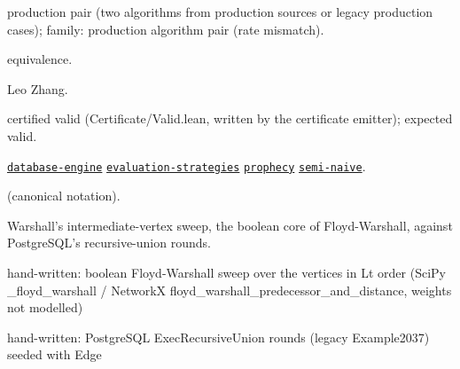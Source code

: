 \documentclass[10pt]{article}
\begin{document}
\begin{description}[leftmargin=2.6cm,style=nextline,itemsep=1pt]

\item[Category] production pair (two algorithms from production sources or legacy production cases); family: production algorithm pair (rate mismatch).

\item[Kind] equivalence.

\item[Contributors] Leo Zhang.

\item[Status] certified valid (Certificate/Valid.lean, written by the certificate emitter); expected valid.

\item[Tags] \hyperref[tag:database-engine]{\texttt{database-engine}} \hyperref[tag:evaluation-strategies]{\texttt{evaluation-strategies}} \hyperref[tag:prophecy]{\texttt{prophecy}} \hyperref[tag:semi-naive]{\texttt{semi-naive}}.

\item[Input]  (canonical notation).

\item[Summary] Warshall's intermediate-vertex sweep, the boolean core of Floyd-Warshall, against PostgreSQL's recursive-union rounds.

\item[Sides] hand-written: boolean Floyd-Warshall sweep over the vertices in Lt order (SciPy \_floyd\_warshall / NetworkX floyd\_warshall\_predecessor\_and\_distance, weights not modelled) \par hand-written: PostgreSQL ExecRecursiveUnion rounds (legacy Example2037) seeded with Edge


\end{description}
\end{document}
